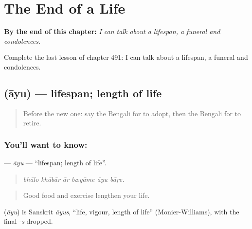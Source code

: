 
\chapter{The End of a Life}
\label{ch:bn-the-end-of-a-life}

\begin{chapteropening}
\textbf{By the end of this chapter:} \emph{I can talk about a lifespan, a funeral and condolences.}

Complete the last lesson of chapter 491: I can talk about a lifespan, a funeral and condolences.
\end{chapteropening}

\section[\texorpdfstring{\bn{আয়ু} (āyu)}{আয়ু (āyu)}]{ (āyu) — lifespan; length of life}

\label{lesson:BN-C491-ayu}



\begin{quote}
Before the new one: say the Bengali for to adopt, then the Bengali for to retire.
\end{quote}

\subsection*{You'll want to know: }
\textbf{} — \emph{āyu} — \textquotedblleft{}lifespan; length of life\textquotedblright{}.

\begin{quote}
     
\end{quote}

\begin{quote}
\emph{bhālo khābār ār bæyāme āyu bāṛe.}
\end{quote}

\begin{quote}
Good food and exercise lengthen your life.
\end{quote}

\begin{cousinweb}
\textbf{} (\emph{āyu}) is Sanskrit \emph{āyus}, \textquotedblleft{}life, vigour, length of life\textquotedblright{} (Monier-Williams), with the final \emph{-s} dropped.
\end{cousinweb}

